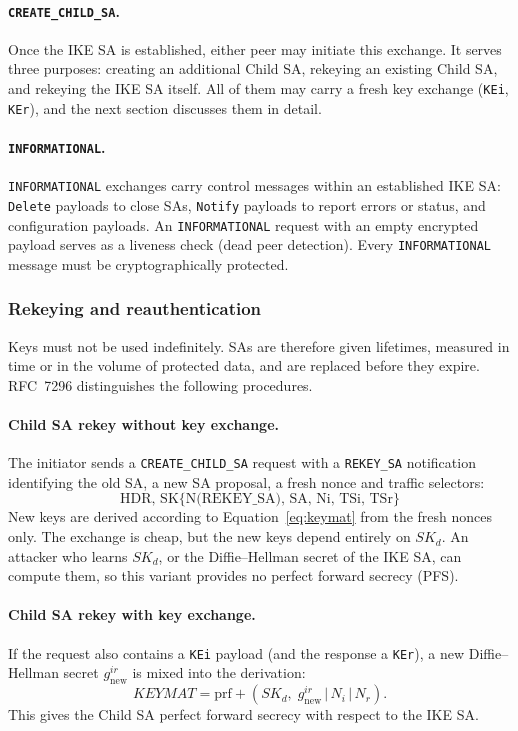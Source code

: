 \paragraph{\texttt{CREATE\_CHILD\_SA}.}
Once the IKE SA is established, either peer may initiate this exchange. It serves three purposes: creating an
additional Child SA, rekeying an existing Child SA, and rekeying the IKE SA
itself. All of them may carry a fresh key exchange (\texttt{KEi},
\texttt{KEr}), and the next section discusses them in detail.

\paragraph{\texttt{INFORMATIONAL}.}
\texttt{INFORMATIONAL} exchanges carry control messages within an established
IKE SA: \texttt{Delete} payloads to close SAs, \texttt{Notify} payloads to
report errors or status, and configuration payloads. An \texttt{INFORMATIONAL}
request with an empty encrypted payload serves as a liveness check (dead peer
detection). Every \texttt{INFORMATIONAL} message must be cryptographically
protected.

\subsubsection{Rekeying and reauthentication}
\label{sec:sota-rekey}

Keys must not be used indefinitely. SAs are therefore given lifetimes, measured
in time or in the volume of protected data, and are replaced before they
expire. RFC~7296 distinguishes the following procedures.

\paragraph{Child SA rekey without key exchange.}
The initiator sends a \texttt{CREATE\_CHILD\_SA} request with a
\texttt{REKEY\_SA} notification identifying the old SA, a new SA proposal,
a fresh nonce and traffic selectors:
\[
    \text{HDR, SK\{N(REKEY\_SA), SA, Ni, TSi, TSr\}}
\]
New keys are derived according to Equation~\eqref{eq:keymat} from the fresh
nonces only. The exchange is cheap, but the new keys depend entirely on
$SK_d$. An attacker who learns $SK_d$, or the Diffie--Hellman secret of the
IKE SA, can compute them, so this variant provides no perfect forward secrecy
(PFS).

\paragraph{Child SA rekey with key exchange.}
If the request also contains a \texttt{KEi} payload (and the response
a \texttt{KEr}), a new Diffie--Hellman secret $g^{ir}_{\mathrm{new}}$ is mixed
into the derivation:
\begin{equation}
    \mathit{KEYMAT} = \mathrm{prf+}(SK_d,\; g^{ir}_{\mathrm{new}} \,|\, N_i \,|\, N_r).
\end{equation}
This gives the Child SA perfect forward secrecy with respect to the IKE SA.

